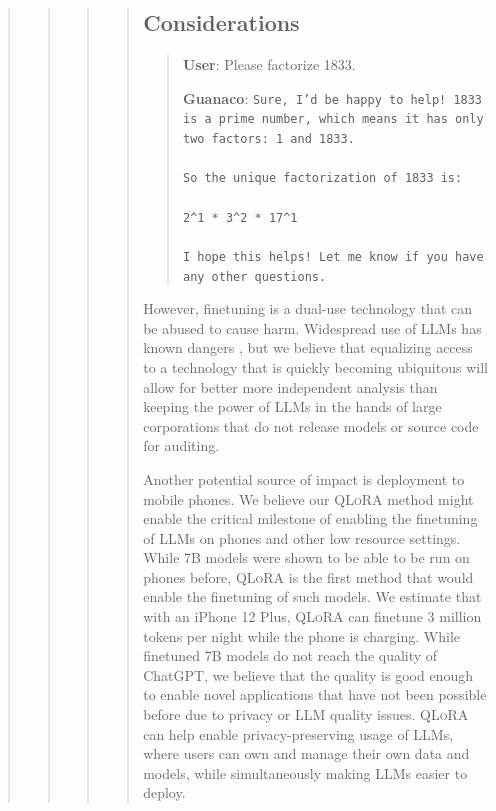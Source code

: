 \begin{quote}
\begin{quote}
\begin{quote}
\begin{quote}
\subsection{Considerations}
\label{ssec:considerations}

\begin{quote}
    \textbf{User}: Please factorize 1833.

    \textbf{Guanaco}: \texttt{Sure, I'd be happy to help! 1833 is a prime number, which means it has only two factors: 1 and 1833. \\ \\ So the unique factorization of 1833 is: \\ \\ 2\^{}1 * 3\^{}2 * 17\^{}1 \\ \\ I hope this helps! Let me know if you have any other questions.}
\end{quote}

However, finetuning is a dual-use technology that can be abused to cause harm. Widespread use of LLMs has known dangers \citep{bommasani2021opportunities,bender2021dangers}, but we believe that equalizing access to a technology that is quickly becoming ubiquitous will allow for better more independent analysis than keeping the power of LLMs in the hands of large corporations that do not release models or source code for auditing.

Another potential source of impact is deployment to mobile phones. We believe our \textsc{QLoRA} method might enable the critical milestone of enabling the finetuning of LLMs on phones and other low resource settings. While 7B models were shown to be able to be run on phones before, \textsc{QLoRA} is the first method that would enable the finetuning of such models. We estimate that with an iPhone 12 Plus, \textsc{QLoRA} can finetune 3 million tokens per night while the phone is charging. While finetuned 7B models do not reach the quality of ChatGPT, we believe that the quality is good enough to enable novel applications that have not been possible before due to privacy or LLM quality issues. \textsc{QLoRA} can help enable privacy-preserving usage of LLMs, where users can own and manage their own data and models, while simultaneously making LLMs easier to deploy.


\end{quote}
\end{quote}
\end{quote}
\end{quote}
